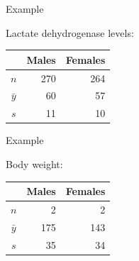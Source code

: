\begin{frame}{Example}

  Lactate dehydrogenase levels:
  \begin{center}
    \begin{tabular}{crr}
       & Males & Females \\
       \hline
       $n$ & 270 & 264 \\
       $\bar y$ & 60 & 57 \\
       $s$ & 11 & 10
     \end{tabular}

   \vspace{2em}

   \end{center}

\end{frame}



\begin{frame}{Example}

  Body weight:
  \begin{center}
    \begin{tabular}{crr}
       & Males & Females \\
       \hline
       $n$ & 2 & 2 \\
       $\bar y$ & 175 & 143 \\
       $s$ & 35 & 34
     \end{tabular}

   \vspace{2em}

   \end{center}

\end{frame}


